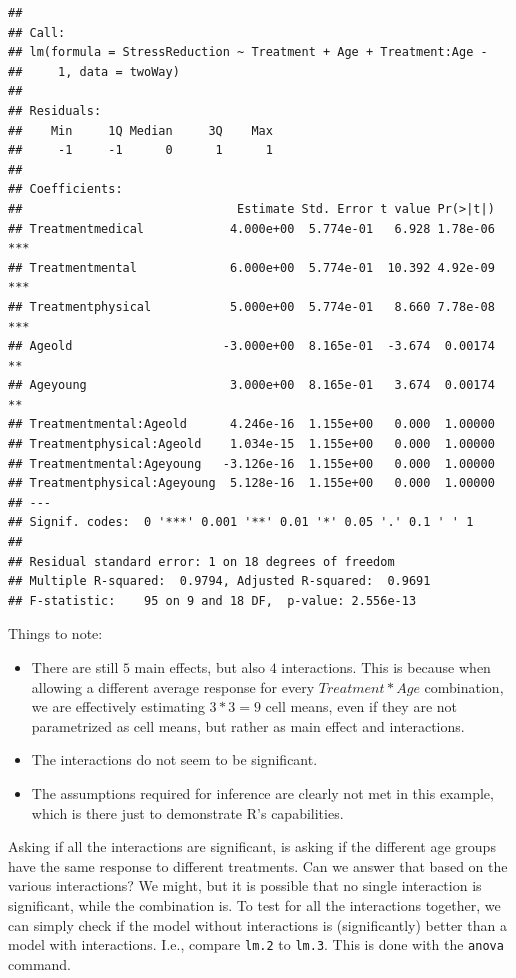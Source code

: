 \documentclass[]{book}
\providecommand{\tightlist}{%
  \setlength{\itemsep}{0pt}\setlength{\parskip}{0pt}}
\theoremstyle{definition}
\theoremstyle{definition}
\theoremstyle{definition}
\theoremstyle{remark}
\begin{document}
\begin{verbatim}
## 
## Call:
## lm(formula = StressReduction ~ Treatment + Age + Treatment:Age - 
##     1, data = twoWay)
## 
## Residuals:
##    Min     1Q Median     3Q    Max 
##     -1     -1      0      1      1 
## 
## Coefficients:
##                              Estimate Std. Error t value Pr(>|t|)    
## Treatmentmedical            4.000e+00  5.774e-01   6.928 1.78e-06 ***
## Treatmentmental             6.000e+00  5.774e-01  10.392 4.92e-09 ***
## Treatmentphysical           5.000e+00  5.774e-01   8.660 7.78e-08 ***
## Ageold                     -3.000e+00  8.165e-01  -3.674  0.00174 ** 
## Ageyoung                    3.000e+00  8.165e-01   3.674  0.00174 ** 
## Treatmentmental:Ageold      4.246e-16  1.155e+00   0.000  1.00000    
## Treatmentphysical:Ageold    1.034e-15  1.155e+00   0.000  1.00000    
## Treatmentmental:Ageyoung   -3.126e-16  1.155e+00   0.000  1.00000    
## Treatmentphysical:Ageyoung  5.128e-16  1.155e+00   0.000  1.00000    
## ---
## Signif. codes:  0 '***' 0.001 '**' 0.01 '*' 0.05 '.' 0.1 ' ' 1
## 
## Residual standard error: 1 on 18 degrees of freedom
## Multiple R-squared:  0.9794, Adjusted R-squared:  0.9691 
## F-statistic:    95 on 9 and 18 DF,  p-value: 2.556e-13
\end{verbatim}

Things to note:

\begin{itemize}
\tightlist
\item
  There are still \(5\) main effects, but also \(4\) interactions. This
  is because when allowing a different average response for every
  \(Treatment*Age\) combination, we are effectively estimating \(3*3=9\)
  cell means, even if they are not parametrized as cell means, but
  rather as main effect and interactions.
\item
  The interactions do not seem to be significant.
\item
  The assumptions required for inference are clearly not met in this
  example, which is there just to demonstrate R's capabilities.
\end{itemize}

Asking if all the interactions are significant, is asking if the
different age groups have the same response to different treatments. Can
we answer that based on the various interactions? We might, but it is
possible that no single interaction is significant, while the
combination is. To test for all the interactions together, we can simply
check if the model without interactions is (significantly) better than a
model with interactions. I.e., compare \texttt{lm.2} to \texttt{lm.3}.
This is done with the \texttt{anova} command.
\end{document}

